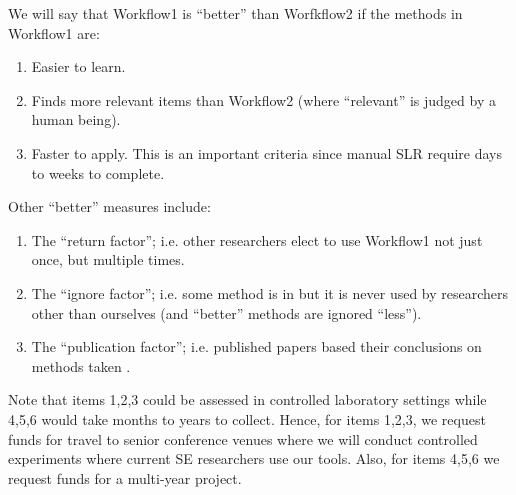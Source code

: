 \noindent
We will say that 
Workflow1 is ``better'' than Worfkflow2 if the methods in Workflow1 are:
\begin{enumerate}[itemsep=0pt,parsep=0pt]
\item Easier to learn.
\item Finds more relevant
items than Workflow2 (where ``relevant'' is judged by a human being). 
\item Faster to apply. This is an important criteria since manual SLR require  days to weeks to complete.
\end{enumerate}
Other ``better'' measures include:
\begin{enumerate}[resume,itemsep=0pt,parsep=0pt]
\item
The ``return factor''; i.e. other researchers  elect to use Workflow1 not just once, but multiple times. 
\item
The ``ignore factor''; i.e. some method is in {\IT} but it is never used by researchers other than ourselves
(and ``better'' methods are ignored ``less'').
\item
The ``publication factor''; i.e. published papers based their conclusions on methods taken     {\IT}.
\end{enumerate}
Note that items 1,2,3 could be assessed in controlled laboratory settings while 4,5,6 would take months to years to collect.
Hence, for items 1,2,3, we request funds for travel to senior conference venues where we will conduct controlled experiments where current
SE researchers use our tools. Also, for items 4,5,6 we request funds for a multi-year project.
\vspace{8pt}


